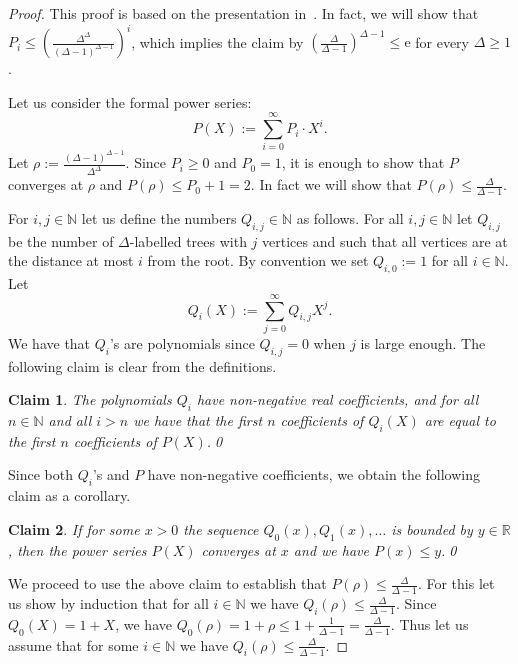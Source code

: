 \documentclass[12pt,a4paper]{article}
\numberwithin{equation}{section}
\newtheorem*{claim*}{Claim}
\theoremstyle{definition}
\newcommand{\De}{{\Delta}}
\renewcommand{\ge}{\geqslant}
\renewcommand{\le}{\leqslant}
\newcommand\N{\mathbb N}
\newcommand\RR{\mathbb R}
\newcommand\NN{\mathbb N}
\renewcommand{\part}[1][]{%
        \ifthenelse{\boolean{theno_parts}}{%
            \begin{enumerate}[wide,label=(\alph*),itemsep=1pt,topsep=0pt,#1]%
                \item
        }{%
            \item
        }
        \setboolean{theno_parts}{false}%
    }
\newcommand{\me}{\mathrm{e}}
\begin{document}
    \begin{proof} 
    \part[wide,label=(\alph*)] This proof is based on the presentation in~\cite{spencer-note}. In fact, we will show that  $P_i \le \left(\frac{\De^\De}{(\De-1)^{\De-1}}\right)^i$, which implies the claim by $(\frac{\De}{\De-1})^{\De-1}\le \me$ for every $\De\ge 1$.
    
    Let us consider the formal power series:
    $$
    P(X) := \sum_{i=0}^\infty P_i\cdot X^i.
    $$
    Let $\rho := \frac{(\De-1)^{\De-1}}{\De^\De}$. Since $P_i\ge 0$ and $P_0=1$, it is enough to show that $P$ converges at $\rho$ and $P(\rho) \le P_0+1=2$. In fact  we will show that $P(\rho)\le \frac{\De}{\De-1}$.
    
    
    For $i,j\in \N$ let us define the numbers $Q_{i,j}\in \N$ as follows. For all $i,j\in \NN$ let $Q_{i,j}$ be the number of $\De$-labelled trees with $j$ vertices and such that all vertices are at the distance at most $i$ from the root. By convention we set $Q_{i,0}:=1$ for all $i\in \NN$.
    Let 
    $$
        Q_i(X) :=\sum_{j=0}^\infty Q_{i,j}X^j.
    $$
    We have that $Q_i$'s are polynomials since $Q_{i,j} = 0$ when $j$ is large enough. The following claim is clear from the definitions.
    \begin{claim*} 
    The polynomials $Q_i$ have non-negative real coefficients, and for all $n\in \NN$  and all $i>n$ we have that the first $n$ coefficients of $Q_i(X)$ are equal to the first $n$ coefficients of $P(X)$.\qed
    \end{claim*}
    
    Since both $Q_i$'s and $P$ have non-negative coefficients, we obtain the following claim as a corollary.
    
    \begin{claim*} 
    If for some $x>0$ the sequence $Q_0(x),Q_1(x),\ldots$ is bounded by $y\in \RR$, then the power series $P(X)$ converges at $x$ and we have $P(x) \le y$.\qed
    \end{claim*}
    
    We proceed to use the above claim to establish that  $P(\rho)\le \frac{\De}{\De-1}$. For this let us show by induction that for all $i\in \NN$ we have $Q_i(\rho)\le  \frac{\De}{\De-1}$.  Since $Q_0(X) = 1+ X$, we have  $Q_0(\rho)=1+ \rho \le 1+\frac{1}{\De-1} =\frac{\De}{\De-1}$. Thus let us assume that for some $i\in\NN$ we have $Q_i(\rho)\le \frac{\De}{\De-1}$. 
    

\end{proof}
\end{document}
